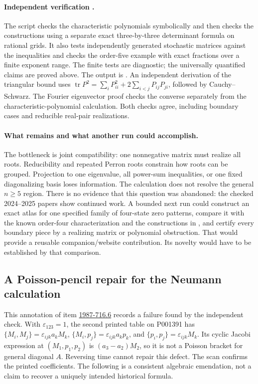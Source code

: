 \paragraph{Independent verification \oursComputed.}
The script  checks the characteristic
polynomials symbolically and then checks the constructions using a
separate exact three-by-three determinant formula on rational grids.
It also tests independently generated stochastic matrices against the
inequalities and checks the order-five example with exact fractions
over a finite exponent range. The finite tests are diagnostic;
the universally quantified claims are proved above.
The output is .
An independent derivation of the triangular bound uses
\(\operatorname{tr}P^2=\sum_iP_{ii}^2+
2\sum_{i<j}P_{ij}P_{ji}\), followed by Cauchy--Schwarz.
The Fourier eigenvector proof checks the converse separately from
the characteristic-polynomial calculation. Both checks agree,
including boundary cases and reducible real-pair realizations.

\paragraph{What remains and what another run could accomplish.}
The bottleneck is joint compatibility: one nonnegative matrix must
realize all roots. Reducibility and repeated Perron roots constrain
how roots can be grouped. Projection to one eigenvalue, all power-sum
inequalities, or one fixed diagonalizing basis loses information.
The calculation does not resolve the general \(n\geq5\) region.
There is no evidence that this question was abandoned: the checked
2024--2025 papers show continued work.
A bounded next run could construct an exact atlas for one specified
family of four-state zero patterns, compare it with the known
order-four characterization and the constructions in
\citet[Section~8]{johnsonpaparella2025perron}, and certify every
boundary piece by a realizing matrix or polynomial obstruction.
That would provide a reusable companion/website contribution.
Its novelty would have to be established by that comparison.

\subsection{A Poisson-pencil repair for the Neumann calculation}
\label{dev:poisson-repair}

This annotation of item \hyperref[item:1987-716.6]{1987-716.6}
records a failure found by the independent check. With
\(\varepsilon_{123}=1\), the second printed table on P001391 has
\(\{M_i,M_j\}=\varepsilon_{ijk}a_kM_k\),
\(\{M_i,p_j\}=\varepsilon_{ijk}a_kp_k\), and
\(\{p_i,p_j\}=\varepsilon_{ijk}M_k\).
Its cyclic Jacobi expression at \((M_1,p_1,p_2)\) is
\((a_3-a_2)M_2\), so it is not a Poisson bracket for general
diagonal \(A\). Reversing time cannot repair this defect.
The scan confirms the printed coefficients. The following is a
consistent algebraic emendation, not a claim to recover a uniquely
intended historical formula.

